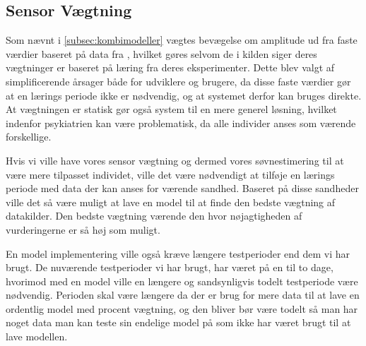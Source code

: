 \subsection{Sensor Vægtning}
Som nævnt i \cref{subsec:kombimodeller} vægtes bevægelse om amplitude ud fra faste værdier baseret på data fra \citet{6563918}, hvilket gøres selvom de i kilden siger deres vægtninger er baseret på læring fra deres eksperimenter.
Dette blev valgt af simplificerende årsager både for udviklere og brugere, da disse faste værdier gør at en lærings periode ikke er nødvendig, og at systemet derfor kan bruges direkte.
At vægtningen er statisk gør også system til en mere generel løsning, hvilket indenfor psykiatrien kan være problematisk, da alle individer anses som værende forskellige.

Hvis vi ville have vores sensor vægtning og dermed vores søvnestimering til at være mere tilpasset individet, ville det være nødvendigt at tilføje en lærings periode med data der kan anses for værende sandhed.
Baseret på disse sandheder ville det så være muligt at lave en model til at finde den bedste vægtning af datakilder.
Den bedste vægtning værende den hvor nøjagtigheden af vurderingerne er så høj som muligt.

En model implementering ville også kræve længere testperioder end dem vi har brugt.
De nuværende testperioder vi har brugt, har været på en til to dage, hvorimod med en model ville en længere og sandsynligvis todelt testperiode være nødvendig.
Perioden skal være længere da der er brug for mere data til at lave en ordentlig model med procent vægtning, og den bliver bør være todelt så man har noget data man kan teste sin endelige model på som ikke har været brugt til at lave modellen.
